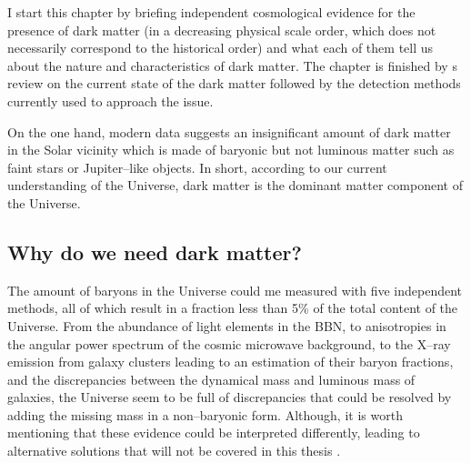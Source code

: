 \documentclass[paper=a4, fontsize=11pt]{scrartcl} %
\numberwithin{equation}{section} %
\numberwithin{figure}{section} %
\numberwithin{table}{section} %
\begin{document}
I start this chapter by briefing independent cosmological evidence for the presence of dark matter (in a decreasing physical scale order, which does not necessarily correspond to the historical order) and what each of them tell us about the nature and characteristics of dark matter. The chapter is finished by s review on the  current state of the dark matter followed by the detection methods currently used to approach the issue.

On the one hand, modern data suggests an insignificant amount of dark matter in the Solar vicinity which is made of baryonic but not luminous matter such as faint stars or Jupiter--like objects. In short, according to our current understanding of the Universe, dark matter is the dominant matter component of the Universe.


\subsection{Why do we need dark matter?}

The amount of baryons in the Universe could me measured with five independent methods, all of which result in a fraction less than 5\% of the total content of the Universe. From the abundance of light elements in the BBN, to anisotropies in the angular power spectrum of the cosmic microwave background, to the X--ray emission from galaxy clusters leading to an estimation of their baryon fractions, and the discrepancies between the dynamical mass and luminous mass of galaxies, the Universe seem to be full of discrepancies that could be resolved by adding the missing mass in a non--baryonic form. Although, it is worth mentioning that these evidence could be interpreted differently, leading to alternative solutions that will not be covered in this thesis \citep[but see e.g. ][]{}.

\end{document}
